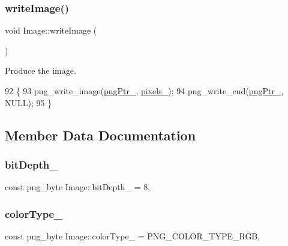 \subsubsection{\texorpdfstring{write\+Image()}{writeImage()}}
{\footnotesize\ttfamily void Image\+::write\+Image (\begin{DoxyParamCaption}{ }\end{DoxyParamCaption})}



Produce the image. 


\begin{DoxyCode}
92                        \{
93     png\_write\_image(\mbox{\hyperlink{class_image_aaf607d2596bac09b13370599d9ba6d8c}{pngPtr\_}}, \mbox{\hyperlink{class_image_a51351c8507499d09cb9667c20ef01faf}{pixels\_}});
94     png\_write\_end(\mbox{\hyperlink{class_image_aaf607d2596bac09b13370599d9ba6d8c}{pngPtr\_}}, NULL);
95 \}
\end{DoxyCode}


\subsection{Member Data Documentation}
\mbox{\label{class_image_ae472f0390f64eb5d49f858ce95e09ce8}} 
\subsubsection{\texorpdfstring{bit\+Depth\+\_\+}{bitDepth\_}}
{\footnotesize\ttfamily const png\+\_\+byte Image\+::bit\+Depth\+\_\+ = 8\hspace{0.3cm}{\ttfamily [static]}, {\ttfamily [private]}}

\mbox{\label{class_image_a94b0dece808a9f06ebb6f4394e8e3048}} 
\subsubsection{\texorpdfstring{color\+Type\+\_\+}{colorType\_}}
{\footnotesize\ttfamily const png\+\_\+byte Image\+::color\+Type\+\_\+ = P\+N\+G\+\_\+\+C\+O\+L\+O\+R\+\_\+\+T\+Y\+P\+E\+\_\+\+R\+GB\hspace{0.3cm}{\ttfamily [static]}, {\ttfamily [private]}}


